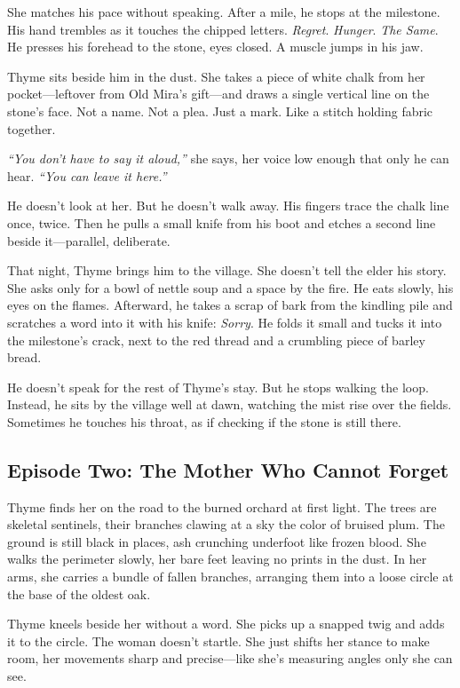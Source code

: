 \documentclass[11pt]{book}
\begin{document}
She matches his pace without speaking. After a mile, he stops at the milestone. His hand trembles as it touches the chipped letters. \textit{Regret}. \textit{Hunger}. \textit{The Same}. He presses his forehead to the stone, eyes closed. A muscle jumps in his jaw.

Thyme sits beside him in the dust. She takes a piece of white chalk from her pocket---leftover from Old Mira's gift---and draws a single vertical line on the stone's face. Not a name. Not a plea. Just a mark. Like a stitch holding fabric together.

\textit{``You don't have to say it aloud,'' } she says, her voice low enough that only he can hear. \textit{``You can leave it here.''}

He doesn't look at her. But he doesn't walk away. His fingers trace the chalk line once, twice. Then he pulls a small knife from his boot and etches a second line beside it---parallel, deliberate.

That night, Thyme brings him to the village. She doesn't tell the elder his story. She asks only for a bowl of nettle soup and a space by the fire. He eats slowly, his eyes on the flames. Afterward, he takes a scrap of bark from the kindling pile and scratches a word into it with his knife: \textit{Sorry}. He folds it small and tucks it into the milestone's crack, next to the red thread and a crumbling piece of barley bread.

He doesn't speak for the rest of Thyme's stay. But he stops walking the loop. Instead, he sits by the village well at dawn, watching the mist rise over the fields. Sometimes he touches his throat, as if checking if the stone is still there.

\subsection*{Episode Two: The Mother Who Cannot Forget}
Thyme finds her on the road to the burned orchard at first light. The trees are skeletal sentinels, their branches clawing at a sky the color of bruised plum. The ground is still black in places, ash crunching underfoot like frozen blood. She walks the perimeter slowly, her bare feet leaving no prints in the dust. In her arms, she carries a bundle of fallen branches, arranging them into a loose circle at the base of the oldest oak.

Thyme kneels beside her without a word. She picks up a snapped twig and adds it to the circle. The woman doesn't startle. She just shifts her stance to make room, her movements sharp and precise---like she's measuring angles only she can see.
\end{document}
